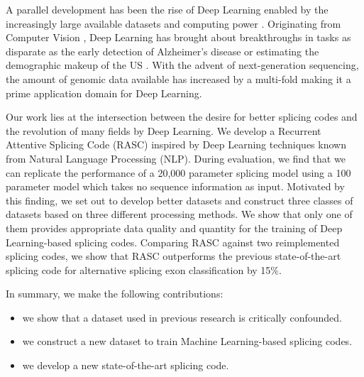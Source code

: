 


A parallel development has been the rise of Deep Learning enabled by the increasingly large available datasets and computing power \cite{deeplearning}. 
Originating from Computer Vision , Deep Learning has brought about breakthroughs in tasks as disparate as the early detection of Alzheimer's disease \cite{alzheimerdeeplearning} or estimating the demographic makeup of the US \cite{demographic}. 
With the advent of next-generation sequencing, the amount of genomic data available has increased by a multi-fold making it a prime application domain for Deep Learning. 



Our work lies at the intersection between the desire for better splicing codes and the revolution of many fields by Deep Learning. We develop a Recurrent Attentive Splicing Code (RASC) inspired by Deep Learning techniques known from Natural Language Processing (NLP). During evaluation, we find that we can replicate the performance of a 20,000 parameter splicing model using a 100 parameter model which takes no sequence information as input. Motivated by this finding, we set out to develop better datasets and construct three classes of datasets based on three different processing methods. We show that only one of them provides appropriate data quality and quantity for the training of Deep Learning-based splicing codes. Comparing RASC against two reimplemented splicing codes, we show that RASC outperforms the previous state-of-the-art splicing code for alternative splicing exon classification by 15\%. 


In summary, we make the following contributions:
\begin{itemize}
	\item we show that a dataset used in previous research is critically confounded.
	\item we construct a new dataset to train Machine Learning-based splicing codes.
	\item we develop a new state-of-the-art splicing code.
\end{itemize}


